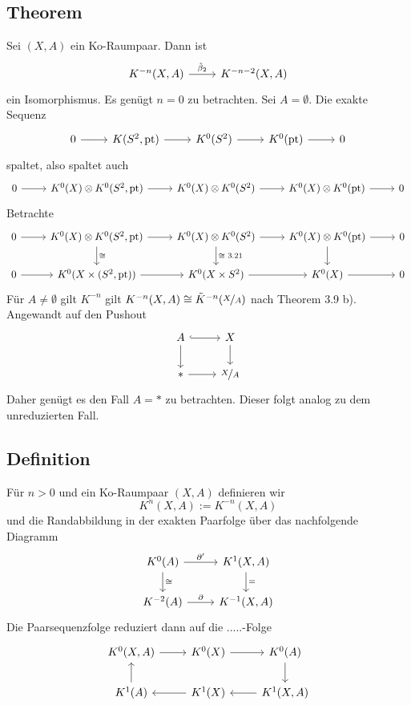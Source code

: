 \subsection*{Theorem} %
\label{sub:theorem}
Sei $(X,A)$ ein Ko-Raumpaar. Dann ist 
\[
	\begin{tikzcd}
		K^{-n}(X,A) \rar["\hat{\beta}_2"] & K^{-n-2}(X,A)
	\end{tikzcd}
\]
ein Isomorphismus.
Es genügt $n=0$ zu betrachten. Sei $A=\emptyset$. Die exakte Sequenz
\[
	\begin{tikzcd}
		0 \rar & K(S^2,\pt) \rar & K^0(S^2) \rar & K^0(\pt) \rar & 0
	\end{tikzcd}
\]
spaltet, also spaltet auch
\[
	\begin{tikzcd}
		0 \rar & K^0(X) \otimes K^0(S^2,\pt) \rar & K^0(X) \otimes K^0(S^2) \rar & K^0(X) \otimes K^0(\pt) \rar & 0
	\end{tikzcd}
\]
Betrachte
\[
	\begin{tikzcd}
		0 \rar & K^0(X) \otimes K^0(S^2,\pt) \dar["\cong"] \rar & K^0(X) \otimes K^0(S^2) \rar \dar["\cong\text{ 3.21}",] & K^0(X) \otimes K^0(\pt) \rar \dar & 0 \\
		0 \rar & K^0(X \times (S^2,\pt)) \rar & K^0(X \times S^2) \rar & K^0(X) \rar & 0
	\end{tikzcd}
\]
Für $A \not= \emptyset$ gilt $K^{-n}$ gilt $K^{-n}(X,A) \cong \tilde{K}^{-n}(\nicefrac{X}{A})$ nach Theorem 3.9 b). Angewandt auf den Pushout
\[
	\begin{tikzcd}
		A \rar[hook] \dar & X \dar \\
		* \rar & \nicefrac{X}{A}
	\end{tikzcd}
\]
Daher genügt es den Fall $A=*$ zu betrachten. Dieser folgt analog zu dem unreduzierten Fall.

\subsection*{Definition}
Für $n>0$ und ein Ko-Raumpaar $(X,A)$ definieren wir
\[
	K^n(X,A) := K^{-n}(X,A)
\]
und die Randabbildung in der exakten Paarfolge über das nachfolgende Diagramm
\[
	\begin{tikzcd}
		K^0(A) \dar["\cong"] \rar["\partial'"] & K^1(X,A) \dar["="]\\
		K^{-2}(A) \rar["\partial"] &K^{-1}(X,A)
	\end{tikzcd}
\]
Die Paarsequenzfolge reduziert dann auf die .....-Folge
\[
	\begin{tikzcd}
		K^0(X,A) \rar & K^0(X) \rar & K^0(A) \dar\\
		K^1(A) \uar & K^1(X) \lar & K^1(X,A) \lar 
	\end{tikzcd}
\]

